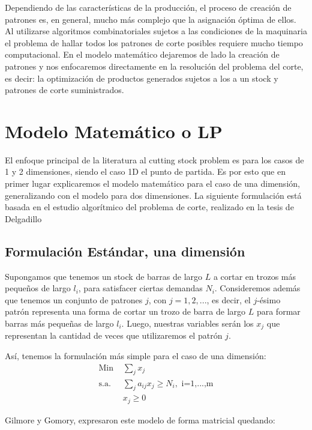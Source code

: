 \documentclass[journal, 10pt]{IEEEtran}
\begin{document}
	Dependiendo de las características de la producción, el proceso de creación
	de patrones es, en general, mucho más complejo que la asignación óptima de 
	ellos. Al utilizarse algoritmos combinatoriales sujetos a las condiciones
	de la maquinaria el problema de hallar todos los patrones de corte posibles
	requiere mucho tiempo computacional. En el modelo matemático dejaremos de 
	lado la creación de patrones y nos enfocaremos directamente en la resolución
	del problema del corte, es decir: la optimización de productos generados 
	sujetos a los a un stock y patrones de corte suministrados.

\section{Modelo Matemático o LP}
	El enfoque principal de la literatura al cutting stock problem es para los
	casos de 1 y 2 dimensiones, siendo el caso 1D el punto de partida. Es por 
	esto que en primer lugar explicaremos el modelo matemático para el caso 
	de una dimensión, generalizando con el modelo para dos dimensiones. La
	siguiente formulación está basada en el estudio algorítmico del problema de 
	corte, realizado en la tesis de Delgadillo~\cite{Delgadillo:2007}
	
\subsection{Formulación Estándar, una dimensión}
	Supongamos que tenemos un stock de barras de largo $L$ a cortar en trozos 
	más pequeños de largo $l_i$, para satisfacer ciertas demandas $N_i$.
	Consideremos además que tenemos un conjunto de patrones $j$, con
	$j=1,2,...$, es decir, el $j$-ésimo patrón representa una forma de cortar un
	trozo de barra de largo $L$ para formar barras más pequeñas de largo $l_i$.
	Luego, nuestras variables serán los $x_j$ que representan la cantidad de
	veces que utilizaremos el patrón $j$.
	
	Así, tenemos la formulación más simple para el caso de una dimensión:
	\begin{align*}
		\text{Min  } &\sum\limits_{j} x_j\\
		\text{s.a.  } &\sum\limits_{j} a_{ij}x_j \geq N_i, \text{ i=1,...,m}\\
			&x_j \geq 0
	\end{align*}
	
	Gilmore y Gomory\cite{Gilmore:1961}, expresaron este modelo de forma 
	matricial quedando:
	
\end{document}
